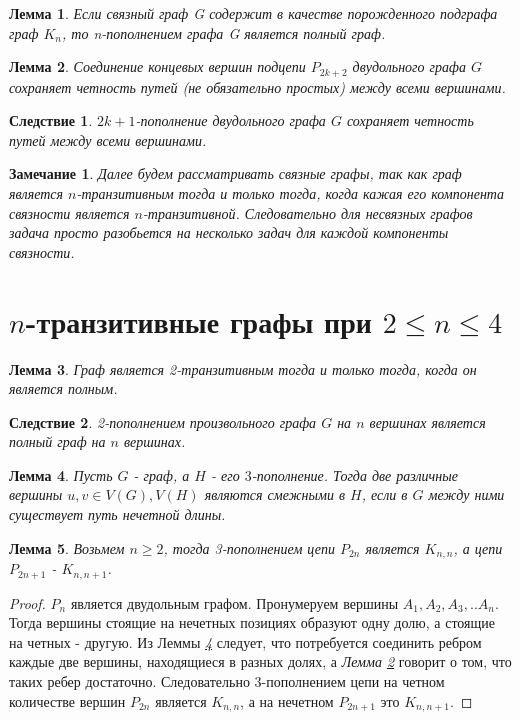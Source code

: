 \documentclass[a4paper,12pt]{article}
\theoremstyle{plain}
\newtheorem{lemma}{Лемма}
\newtheorem*{corollary*}{Следствие}
\theoremstyle{definition}
\newtheorem{remark}{Замечание}
\begin{document}
	
	\begin{lemma}\label{l2}
		{\it Если связный граф G содержит в качестве порожденного подграфа граф $K_{n}$, то n-пополнением графа G является полный граф.}
	\end{lemma}  
	

	\begin{lemma}\label{l3}
		{\it Соединение концевых вершин подцепи $P_{2k+2}$ двудольного графа $G$ сохраняет четность путей (не обязательно простых) между всеми вершинами.}
	\end{lemma}
	
	
	\begin{corollary*}
		{\it $2k+1$-пополнение двудольного графа $G$ сохраняет четность путей между всеми вершинами.}
	\end{corollary*}
 
	
	\begin{remark}
		{\it Далее будем рассматривать связные графы, так как граф является $n$-транзитивным тогда и только тогда, когда кажая его компонента связности является $n$-транзитивной. Следовательно для несвязных графов задача просто разобьется на несколько задач для каждой компоненты связности.}
	\end{remark}

	
	\section{$n$-транзитивные графы при $ 2 \leq n \leq 4 $}
	
	
	\begin{lemma}\label{l4}
		{\it Граф является 2-транзитивным тогда и только тогда, когда он является полным. }
	\end{lemma}
	
	
\begin{corollary*}
		{\it 2-пополнением произвольного графа $G$ на $n$ вершинах является полный граф на $n$ вершинах.}
	\end{corollary*}

  
   
  \begin{lemma}\label{l5}
		{\it Пусть $G$ - граф, а $H$ - его $3$-пополнение. Тогда две различные вершины $u, v \in V(G), V(H) $  являются смежными в $H$, если в $G$ между ними существует путь нечетной длины. }
	\end{lemma}
	
	\begin{lemma}\label{l6}
		{\it Возьмем $n \geq 2 $, тогда 3-пополнением цепи $P_{2n}$ является $K_{n,n}$, а цепи $P_{2n+1}$ - $K_{n,n+1}$. }
	\end{lemma}
	\begin{proof}
	$P_{n}$ является двудольным графом. Пронумеруем вершины $A_{1}, A_{2}, A_{3},..A_{n}$. Тогда вершины стоящие на нечетных позициях образуют одну долю, а стоящие на четных - другую. Из Леммы \emph{\ref{l5}} следует, что потребуется соединить ребром каждые две вершины, находящиеся в разных долях, а \emph{ Лемма \ref{l3}} говорит о том, что таких ребер достаточно. Следовательно 3-пополнением цепи на четном количестве вершин  $P_{2n}$ является $K_{n,n}$, а на нечетном $P_{2n+1}$ это $K_{n,n+1}$.
	\end{proof}
\end{document}
